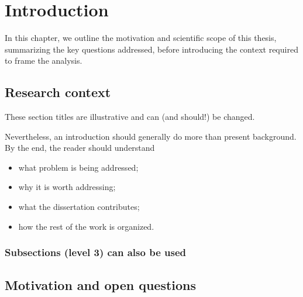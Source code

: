 %
%

\chapteropen
\chapter{Introduction}\label{ch:introduction}
\quoteOne




In this chapter, we outline the motivation and scientific scope of this thesis, summarizing the key questions addressed, before introducing the context required to frame the analysis. 

\section{Research context}

These section titles are illustrative and can (and should!) be changed.

Nevertheless, an introduction should generally do more than present background. By the end, the reader should understand

\begin{itemize}
    \item what problem is being addressed;
    \item why it is worth addressing;
    \item what the dissertation contributes;
    \item how the rest of the work is organized.
\end{itemize}

\subsection{Subsections (level 3) can also be used}

\section{Motivation and open questions}

